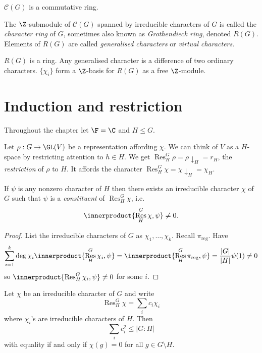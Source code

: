 \documentclass[a4paper]{article}
\newcommand*{\ip}{\innerproduct} %
\DeclareMathOperator{\Res}{Res} %
\theoremstyle{definition}
\begin{document}
\(\mathcal C(G)\) is a commutative ring.

\begin{definition}
  The \(\Z\)-submodule of \(\mathcal C(G)\) spanned by irreducible characters of \(G\) is called the \emph{character ring} of \(G\), sometimes also known as \emph{Grothendieck ring}, denoted \(R(G)\). Elements of \(R(G)\) are called \emph{generalised characters} or \emph{virtual characters}.
\end{definition}

\(R(G)\) is a ring. Any generalised character is a difference of two ordinary characters. \(\{\chi_i\}\) form a \(\Z\)-basis for \(R(G)\) as a free \(\Z\)-module.

\section{Induction and restriction}

Throughout the chapter let \(\F = \C\) and \(H \leq G\).

\begin{definition}[restriction]
  Let \(\rho: G \to \GL(V)\) be a representation affording \(\chi\). We can think of \(V\) as a \(H\)-space by restricting attention to \(h \in H\). We get \(\Res^G_H \rho = \rho \downarrow_H = r_H\), the \emph{restriction} of \(\rho\) to \(H\). It affords the character \(\Res^G_H \chi = \chi \downarrow_H = \chi_H\).
\end{definition}

\begin{lemma}
  If \(\psi\) is any nonzero character of \(H\) then there exists an irreducible character \(\chi\) of \(G\) such that \(\psi\) is a \emph{constituent} of \(\Res_H^G \chi\), i.e.
  \[
    \ip{\Res_H^G \chi, \psi} \neq 0.
  \]
\end{lemma}

\begin{proof}
  List the irreducible characters of \(G\) as \(\chi_1, \dots, \chi_k\). Recall \(\pi_{\text{reg}}\). Have
  \[
    \sum_{i = 1}^k \deg \chi_i \ip{\Res_H^G \chi_i, \psi}
    = \ip{\Res_H^G \pi_{\text{reg}}, \psi}
    = \frac{|G|}{|H|} \psi(1)
    \neq 0
  \]
  so \(\ip{\Res_H^G \chi_i, \psi} \neq 0\) for some \(i\).
\end{proof}

\begin{lemma}
  Let \(\chi\) be an irreducible character of \(G\) and write
  \[
    \Res_H^G \chi = \sum_i c_i \chi_i
  \]
  where \(\chi_i\)'s are irreducible characters of \(H\). Then
  \[
    \sum_i c_i^2 \leq |G:H|
  \]
  with equality if and only if \(\chi(g) = 0\) for all \(g \in G \setminus H\).
\end{lemma}
\end{document}
